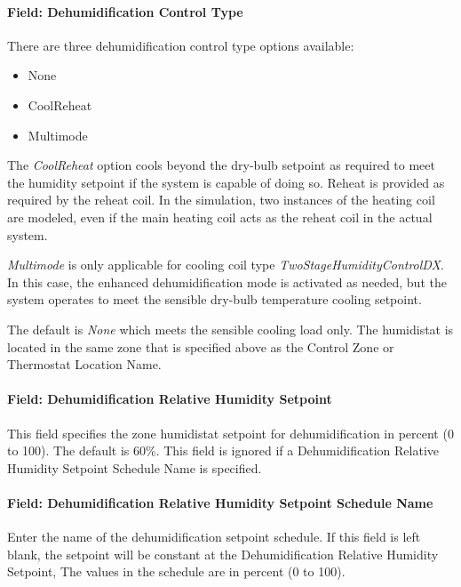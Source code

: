 \paragraph{Field: Dehumidification Control Type}\label{field-dehumidification-control-type-2}

There are three dehumidification control type options available:

\begin{itemize}
\item
  None
\item
  CoolReheat
\item
  Multimode
\end{itemize}

The \emph{CoolReheat} option cools beyond the dry-bulb setpoint as required to meet the humidity setpoint if the system is capable of doing so. Reheat is provided as required by the reheat coil. In the simulation, two instances of the heating coil are modeled, even if the main heating coil acts as the reheat coil in the actual system.

\emph{Multimode} is only applicable for cooling coil type \emph{TwoStageHumidityControlDX}. In this case, the enhanced dehumidification mode is activated as needed, but the system operates to meet the sensible dry-bulb temperature cooling setpoint.

The default is \emph{None} which meets the sensible cooling load only. The humidistat is located in the same zone that is specified above as the Control Zone or Thermostat Location Name.

\paragraph{Field: Dehumidification Relative Humidity Setpoint}\label{field-dehumidification-relative-humidity-setpoint}

This field specifies the zone humidistat setpoint for dehumidification in percent (0 to 100). The default is 60\%. This field is ignored if a Dehumidification Relative Humidity Setpoint Schedule Name is specified.

\paragraph{Field: Dehumidification Relative Humidity Setpoint Schedule Name}\label{field-dehumidification-relative-humidity-setpoint-schedule-name}

Enter the name of the dehumidification setpoint schedule. If this field is left blank, the setpoint will be constant at the Dehumidification Relative Humidity Setpoint, The values in the schedule are in percent (0 to 100).

